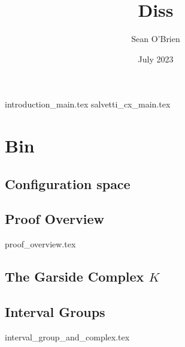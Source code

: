 \documentclass{article}
\title{Diss}
\author{Sean O'Brien}
\date{July 2023}
\begin{document}
\maketitle
{introduction_main.tex}
{salvetti_cx_main.tex}


\section{Bin}
\subsection{Configuration space}
\subsection{Proof Overview}
{proof_overview.tex}
\subsection{The Garside Complex $K$}
\subsection{Interval Groups}
{interval_group_and_complex.tex}

\printbibliography
\end{document}
